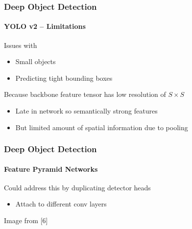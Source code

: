 \documentclass[xetex,professionalfont]{beamer}
\begin{document}
\begin{frame}
	\frametitle{Deep Object Detection}
	\framesubtitle{YOLO v2 -- Limitations}

	Issues with
	\begin{itemize}
		\item Small objects
		\item Predicting tight bounding boxes
	\end{itemize}

	\bigskip

	Because backbone feature tensor has low resolution of $S\times S$
	\begin{itemize}
		\item Late in network so semantically strong features
		\item But limited amount of spatial information due to pooling
	\end{itemize}

\end{frame}


\begin{frame}
	\frametitle{Deep Object Detection}
	\framesubtitle{Feature Pyramid Networks}

	Could address this by duplicating detector heads
	\begin{itemize}
		\item Attach to different conv layers
	\end{itemize}

	\bigskip

	\begin{center}
		{\centering Image from [6]}
	\end{center}

\end{frame}
\end{document}
